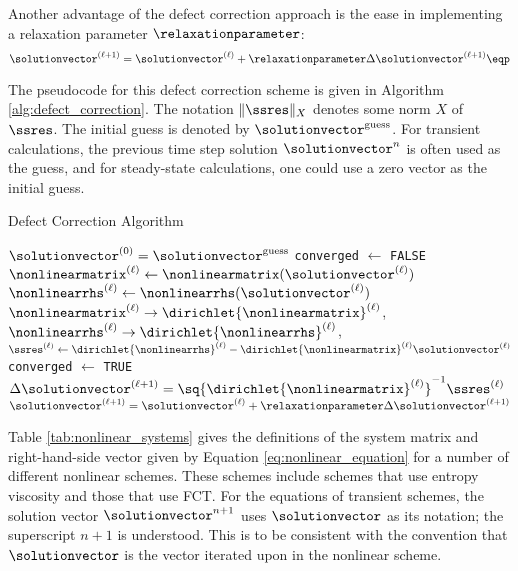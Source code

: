 Another advantage of the defect correction approach is the ease in implementing
a relaxation parameter $\relaxationparameter$:
\begin{equation}
  \solutionvector^{(\ell+1)} = \solutionvector^{(\ell)}
    + \relaxationparameter\Delta\solutionvector^{(\ell+1)} \eqp
\end{equation}

The pseudocode for this defect correction scheme is given in Algorithm
\ref{alg:defect_correction}.
The notation $\|\ssres\|_X$ denotes some norm $X$ of $\ssres$.
The initial guess is denoted by $\solutionvector^{\text{guess}}$. For
transient calculations, the previous time step solution $\solutionvector^n$
is often used as the guess, and for steady-state calculations, one
could use a zero vector as the initial guess.

\begin{algorithm}[H]
\caption{Defect Correction Algorithm}
\label{alg:defect_correction}
\begin{algorithmic}
\State $\solutionvector^{(0)} = \solutionvector^{\text{guess}}$
\State \texttt{converged} $\gets$ \texttt{FALSE}
  \State $\nonlinearmatrix^{(\ell)} \gets
    \nonlinearmatrix(\solutionvector^{(\ell)})$
  \State $\nonlinearrhs^{(\ell)} \gets
    \nonlinearrhs(\solutionvector^{(\ell)})$
  \State $\nonlinearmatrix^{(\ell)} \rightarrow \dirichlet{\nonlinearmatrix}^{(\ell)}$,
    $\nonlinearrhs^{(\ell)} \rightarrow \dirichlet{\nonlinearrhs}^{(\ell)}$,
  \State $\ssres^{(\ell)} \gets \dirichlet{\nonlinearrhs}^{(\ell)}
    - \dirichlet{\nonlinearmatrix}^{(\ell)}\solutionvector^{(\ell)}$
    \State \texttt{converged} $\gets$ \texttt{TRUE}
    \Break
  \EndIf
  \State $\Delta\solutionvector^{(\ell+1)}
    = \sq{\dirichlet{\nonlinearmatrix}^{(\ell)}}^{-1}\ssres^{(\ell)}$
  \State $\solutionvector^{(\ell+1)} = \solutionvector^{(\ell)}
    + \relaxationparameter\Delta\solutionvector^{(\ell+1)}$
\EndFor
{}
\EndIf
\end{algorithmic}
\end{algorithm}

Table \ref{tab:nonlinear_systems} gives the definitions of the system matrix
and right-hand-side vector given by Equation \eqref{eq:nonlinear_equation}
for a number of different nonlinear schemes. These schemes include schemes
that use entropy viscosity and those that use FCT. For the equations of
transient schemes, the solution vector $\solutionvector^{n+1}$ uses
$\solutionvector$ as its notation; the superscript $n+1$ is understood.
This is to be consistent
with the convention that $\solutionvector$ is the vector iterated upon in
the nonlinear scheme.

